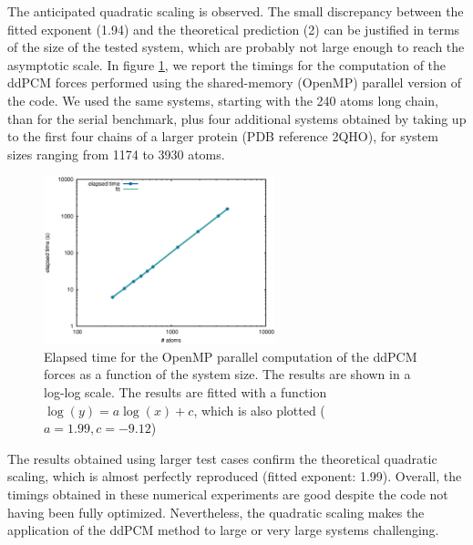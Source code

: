 The anticipated quadratic scaling is observed. The small discrepancy between the fitted exponent (1.94) and the theoretical prediction (2) can be justified in terms of the size of the tested system, which are probably not large enough to reach the asymptotic scale. 
In figure \ref{fig:para}, we report the timings for the computation of the ddPCM forces performed using the shared-memory (OpenMP) parallel version of the code. 
We used the same systems, starting with the 240 atoms long chain, than for the serial benchmark, plus four additional systems obtained by taking up to the first four chains of a larger protein (PDB reference 2QHO), for system sizes ranging from 1174 to 3930 atoms. 
\begin{figure}
 \caption{Elapsed time for the OpenMP parallel computation of the ddPCM forces as a function of the system size. The results are shown in a log-log scale. The results are fitted with a function $\log (y) = a \log(x) + c$, which is also plotted ($a=1.99, c=-9.12$)\label{fig:para}}
 \includegraphics[width=0.6\textwidth]{figs/para.eps}
\end{figure}
The results obtained using larger test cases confirm the theoretical quadratic scaling, which is almost perfectly reproduced (fitted exponent: 1.99). 
Overall, the timings obtained in these numerical experiments are good despite the code not having been fully optimized. Nevertheless, the quadratic scaling makes the application of the ddPCM method to large or very large systems challenging. 

